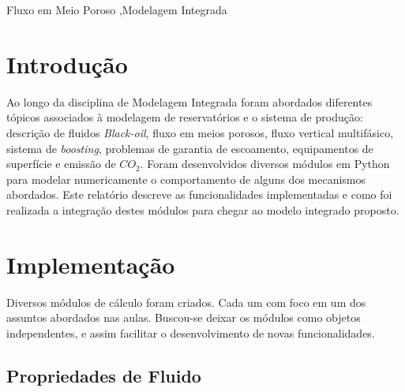 \documentclass[final,5p]{elsarticle}
\numberwithin{equation}{section}
\begin{document}
\begin{frontmatter}

\begin{keyword}
    Fluxo em Meio Poroso \sep Modelagem Integrada



\end{keyword}

\end{frontmatter}


\section{Introdução}

    Ao longo da disciplina de Modelagem Integrada foram abordados diferentes tópicos associados à modelagem de reservatórios e o sistema de produção: descrição de fluidos \emph{Black-oil}, fluxo em meios porosos, fluxo vertical multifásico, sistema de \emph{boosting}, problemas de garantia de escoamento, equipamentos de superfície e emissão de $CO_2$.
    Foram desenvolvidos diversos módulos em Python para modelar numericamente o comportamento de alguns dos mecanismos abordados. Este relatório descreve as funcionalidades implementadas e como foi realizada a integração destes módulos para chegar ao modelo integrado proposto.

\section{Implementação}

    Diversos módulos de cálculo foram criados. Cada um com foco em um dos assuntos abordados nas aulas. Buscou-se deixar os módulos como objetos independentes, e assim facilitar o desenvolvimento de novas funcionalidades.

    \subsection{Propriedades de Fluido}
\end{document}
